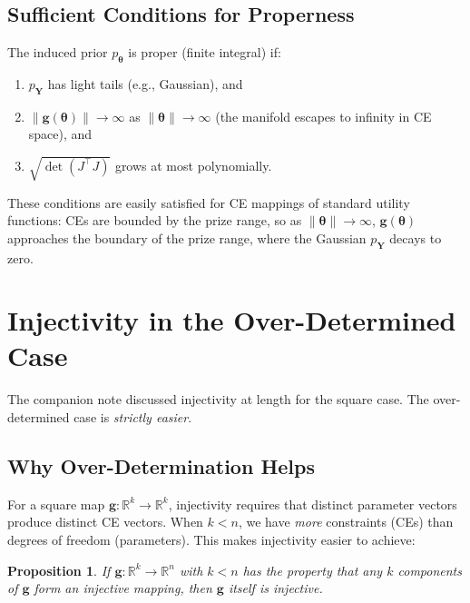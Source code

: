 \documentclass[11pt,a4paper]{article}
\newtheorem{proposition}[theorem]{Proposition}
\theoremstyle{definition}
\newcommand{\btheta}{\boldsymbol{\theta}}
\begin{document}
\subsection{Sufficient Conditions for Properness}

The induced prior $p_{\btheta}$ is proper (finite integral) if:
\begin{enumerate}
    \item $p_{\mathbf{Y}}$ has light tails (e.g., Gaussian), and
    \item $\|\mathbf{g}(\btheta)\| \to \infty$ as $\|\btheta\| \to \infty$
    (the manifold escapes to infinity in CE space), and
    \item $\sqrt{\det(J^\top J)}$ grows at most polynomially.
\end{enumerate}
These conditions are easily satisfied for CE mappings of standard utility
functions: CEs are bounded by the prize range, so as $\|\btheta\| \to
\infty$, $\mathbf{g}(\btheta)$ approaches the boundary of the prize range,
where the Gaussian $p_{\mathbf{Y}}$ decays to zero.


\section{Injectivity in the Over-Determined Case}
\label{sec:injectivity}

The companion note discussed injectivity at length for the square case.
The over-determined case is \emph{strictly easier}.

\subsection{Why Over-Determination Helps}

For a square map $\mathbf{g}: \mathbb{R}^k \to \mathbb{R}^k$, injectivity
requires that distinct parameter vectors produce distinct CE vectors. When
$k < n$, we have \emph{more} constraints (CEs) than degrees of freedom
(parameters). This makes injectivity easier to achieve:

\begin{proposition}
\label{prop:over_inject}
If $\mathbf{g}: \mathbb{R}^k \to \mathbb{R}^n$ with $k < n$ has the property
that any $k$ components of $\mathbf{g}$ form an injective mapping, then
$\mathbf{g}$ itself is injective.
\end{proposition}
\end{document}

